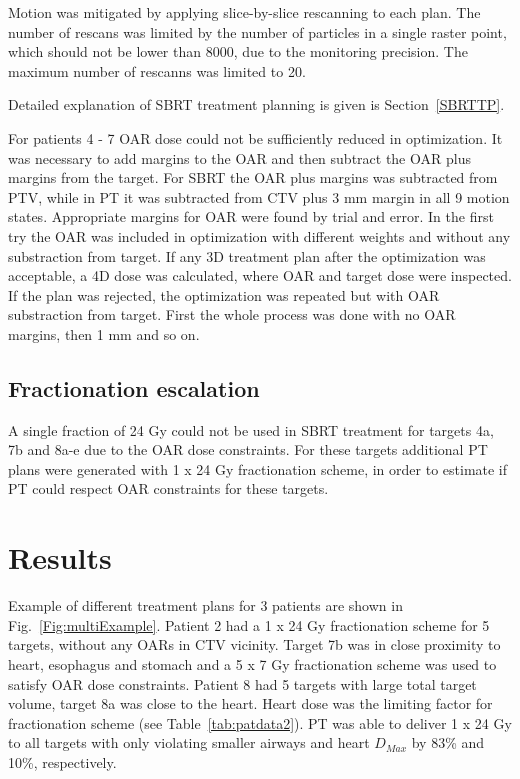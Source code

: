 \documentclass[type=dr, dr=rernat, accentcolor=tud7b,colorbacktitle, bigchapter, openright, twoside, 12pt ]{tudthesis}
\begin{document}
Motion was mitigated by applying slice-by-slice rescanning to each plan. The number of rescans was limited by the number of particles in a single raster point, which should not be lower than 8000, due to the
monitoring precision. The maximum number of rescanns was limited to 20.

Detailed explanation of SBRT treatment planning is given is Section~\ref{SBRTTP}.

For patients 4 - 7 OAR dose could not be sufficiently reduced in optimization. It was necessary to add margins to the OAR and then 
subtract the OAR plus margins from the target. For SBRT the OAR plus margins was subtracted from PTV, while in PT it was subtracted from CTV plus 3 mm margin in all 9 motion states. Appropriate margins for OAR were found 
by trial and error. In the first try the OAR was included in optimization with different weights and without any substraction from target. If any 3D treatment plan after the optimization was acceptable, a 4D dose was calculated, 
where OAR and target dose were inspected. If the plan was rejected, the optimization was repeated but with OAR substraction from target. First the whole process was done with no OAR margins, then 1 mm and so on. 


\subsection{Fractionation escalation}

A single fraction of 24 Gy could not be used in SBRT treatment for targets 4a, 7b and 8a-e due to the OAR dose constraints. For these targets additional PT plans were generated with 1 x 24 Gy fractionation scheme, in order
to estimate if PT could respect OAR constraints for these targets. 


\section{Results}

Example of different treatment plans for 3 patients are shown in Fig.~\ref{Fig:multiExample}. Patient 2 had a 1 x 24 Gy fractionation scheme for 5 targets, without any OARs in CTV vicinity.
Target 7b was in close proximity to heart, esophagus and stomach and a 5 x 7 Gy fractionation scheme was used to satisfy OAR dose constraints. Patient 8 had 5 targets with large total target
volume, target 8a was close to the heart. Heart dose was the limiting factor for fractionation scheme (see Table~\ref{tab:patdata2}). PT was able to deliver 1 x 24 Gy to all targets with only
violating smaller airways and heart $D_{Max}$ by 83\% and 10\%, respectively.
\end{document}
